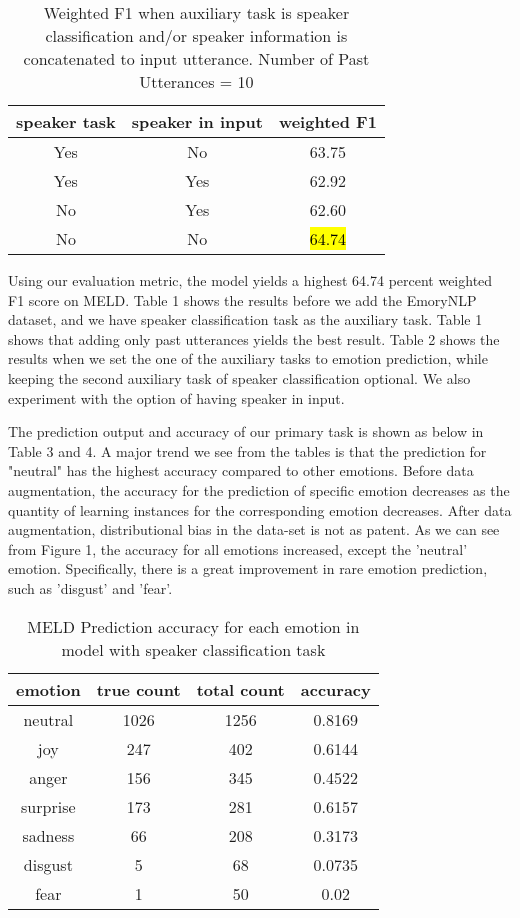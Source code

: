 \documentclass[11pt]{article}
\begin{document}
\begin{table}[hbt]
  \centering
  \begin{tabular}{c|c|c}
    speaker task & speaker in input & weighted F1 \\
    \hline
    Yes & No & 63.75 \\
    \hline
    Yes & Yes & 62.92 \\
    \hline
    No & Yes & 62.60 \\
    \hline
    No & No & \hl{64.74} \\
  \end{tabular}
  \caption{Weighted F1 when auxiliary task is speaker classification and/or speaker information is concatenated to input utterance. Number of Past Utterances = 10}
\end{table}

Using our evaluation metric, the model yields a highest 64.74 percent weighted F1 score on MELD. Table 1 shows the results before we add the EmoryNLP dataset, and we have speaker classification task as the auxiliary task. Table 1 shows that adding only past utterances yields the best result. Table 2 shows the results when we set the one of the auxiliary tasks to emotion prediction, while keeping the second auxiliary task of speaker classification optional. We also experiment with the option of having speaker in input.

The prediction output and accuracy of our primary task is shown as below in Table 3 and 4. A major trend we see from the tables is that the prediction for "neutral" has the highest accuracy compared to other emotions. Before data augmentation, the accuracy for the prediction of specific emotion decreases as the quantity of learning instances for the corresponding emotion decreases. After data augmentation, distributional bias in the data-set is not as patent. As we can see from Figure 1, the accuracy for all emotions increased,  except the 'neutral' emotion.  Specifically, there is a great improvement in rare emotion prediction, such as 'disgust' and 'fear'. 

\begin{table}[hbt]
  \centering
  \begin{tabular}{c|c|c|c}
    emotion & true count & total count & accuracy \\
    \hline
    neutral & 1026 & 1256 & 0.8169 \\
    \hline
    joy & 247 & 402 & 0.6144 \\
    \hline
    anger & 156 & 345 & 0.4522  \\
    \hline
    surprise & 173 & 281 & 0.6157 \\
    \hline
    sadness & 66 & 208 & 0.3173 \\
    \hline
    disgust & 5 & 68 & 0.0735  \\
    \hline
    fear & 1 & 50 & 0.02 \\
  \end{tabular}
  \caption{MELD Prediction accuracy for each emotion in model with speaker classification task}
\end{table}
\end{document}

